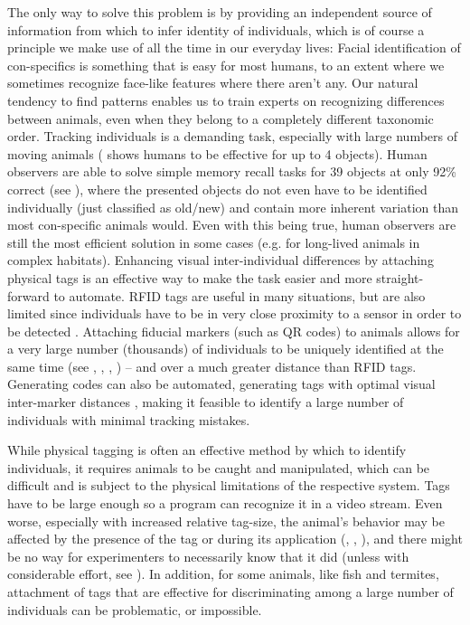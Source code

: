 \documentclass[9pt,lineno]{elife}
\newcommand{\changemade}[1]{#1}
\begin{document}
The only way to solve this problem is by providing an independent source of information from which to infer identity of individuals, which is of course a principle we make use of all the time in our everyday lives: Facial identification of con-specifics is something that \changemade{is easy for most humans}, to an extent where we sometimes recognize face-like features where there aren't any. Our natural tendency to find patterns enables us to train experts on recognizing differences between animals, even when they belong to a completely different taxonomic order. Tracking individuals is a demanding task, especially with large numbers of moving animals (\citealt{liu2009effect} shows humans to be effective for up to 4 objects). Human observers are able to solve simple memory recall tasks for 39 objects at only 92\% correct (see \citealt{humphrey1992recognizing}), where the presented objects do not even have to be identified individually (just classified as old/new) and contain more inherent variation than most con-specific animals would. Even with this being true, human observers are still the most efficient solution in some cases (e.g. for long-lived animals in complex habitats). Enhancing visual inter-individual differences by attaching physical tags is an effective way to make the task easier and more straight-forward to automate. RFID tags are useful in many situations, but are also limited since individuals have to be in very close proximity to a sensor in order to be detected \citep{bonter2011applications}. Attaching \changemade{fiducial markers (such as QR codes)} to animals allows for a very large number \changemade{(thousands) of individuals to be uniquely identified at the same time (see \citealt{Gernat1433}, \citealt{Wild2020.05.06.076943}, \citealt{mersch2013tracking}, \citealt{crall2015beetag}) -- and over a much greater distance than RFID tags.} Generating codes can also be automated, generating tags with optimal visual inter-marker distances \citep{garrido2016generation}, making it feasible to identify a large number of individuals with minimal tracking mistakes.

While physical tagging is often an effective method by which to identify individuals, it requires animals to be caught and manipulated, which can be difficult \citep{mersch2013tracking} and is subject to the physical limitations of the respective system. Tags have to be large enough so a program can recognize it in a video stream. Even worse, especially with increased relative tag-size, the animal's behavior may be affected by the presence of the tag \changemade{or during its application (\citealt{DENNIS20081939}, \citealt{pankiw2003effect}, \citealt{SOCKMAN2001205}),} and there might be no way for experimenters to necessarily know that it did \changemade{(unless with considerable effort, see \citealt{switzer2016bombus})}. In addition, for some animals, like fish and termites, attachment of tags that are effective for discriminating among a large number of individuals can be problematic, or impossible.
\end{document}
